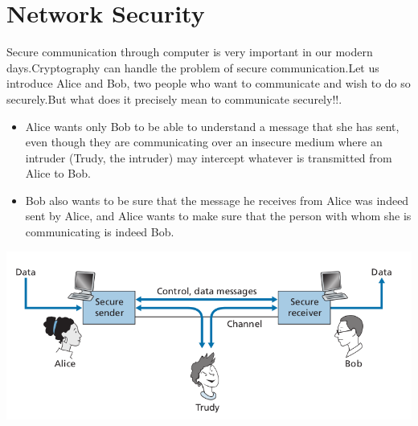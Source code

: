 \documentclass{report}
\begin{document}
{{{\section{Network Security}
\Large{Secure communication through computer is very important in our modern days.Cryptography can handle the problem of secure communication.Let us introduce Alice and Bob, two people who want to communicate and wish
to do so securely.But what does it precisely mean to communicate securely!!.
\begin{itemize}
\item Alice wants only Bob to be able to understand a message that she has sent, even
though they are communicating over an insecure medium where an intruder (Trudy,
the intruder) may intercept whatever is transmitted from Alice to Bob.
\item Bob also
wants to be sure that the message he receives from Alice was indeed sent by Alice,
and Alice wants to make sure that the person with whom she is communicating is
indeed Bob.
\end{itemize}
\includegraphics[scale=0.5]{"seccom.png"}

}
}}}
\end{document}
